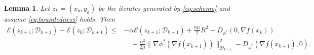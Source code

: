 \documentclass{article}
\theoremstyle{plain}
\newtheorem{lemma}{Lemma}
\theoremstyle{remark}
\begin{document}
\begin{lemma}
\label{thm:single-step}
Let $z_k=(x_k,y_k)$ be the iterates generated by \eqref{eq:scheme} and assume \eqref{eq:boundedness} holds. Then
$$
\begin{aligned}
\mathcal{E}(z_{k+1};\mathcal D_{k+1}) - \mathcal{E}(z_k;\mathcal D_{k+1})
\le{}& -\alpha \mathcal{E}(z_{k+1};\mathcal D_{k+1}) + \frac{\alpha\mu}{2}R^2 - D_{\phi^*}(0,\nabla f(x_k))
\\
&\quad + \frac{\alpha^2}{2\mu}\|\nabla \phi^*(\nabla f(x_{k+1}))\|_{\mathcal D_{k+1}}^2 - D_{\phi^*}(\nabla f(x_{k+1}),0).
\end{aligned}
$$
\end{lemma}


\end{document}
